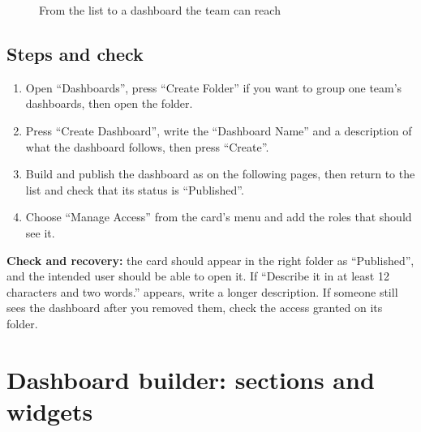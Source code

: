 \begin{figure}[H]
\centering
{}
\rclegend
\caption{From the list to a dashboard the team can reach}
\label{fig:builder-dashboards-flow}
\end{figure}

\subsection{Steps and check}
\begin{enumerate}
\item Open “Dashboards”, press “Create Folder” if you want to group one team's dashboards, then open the folder.
\item Press “Create Dashboard”, write the “Dashboard Name” and a description of what the dashboard follows, then press “Create”.
\item Build and publish the dashboard as on the following pages, then return to the list and check that its status is “Published”.
\item Choose “Manage Access” from the card's menu and add the roles that should see it.
\end{enumerate}

\textbf{Check and recovery:} the card should appear in the right folder as “Published”, and the intended user should be able to open it. If “Describe it in at least 12 characters and two words.” appears, write a longer description. If someone still sees the dashboard after you removed them, check the access granted on its folder.

\clearpage
\section{Dashboard builder: sections and widgets}
\label{sec:builder-feature-dashboards-builder}

